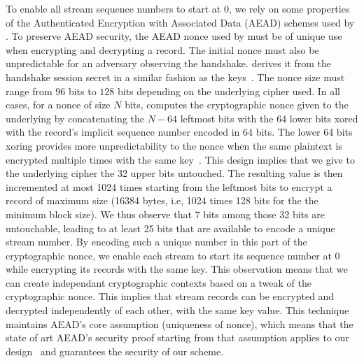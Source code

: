 To enable all stream sequence numbers to start at 0, we rely on some properties of the Authenticated Encryption with Associated Data (AEAD) schemes used
by . To preserve AEAD security, the AEAD nonce used by \tcpls
must be of unique use when encrypting and decrypting a record. The
initial nonce must also be unpredictable for an adversary observing the
handshake. \tcpls derives it from the \tls handshake session secret in
a similar fashion as the \tls keys~\cite{rfc8446}. The nonce size must range from $96$ bits to $128$ bits depending on the underlying cipher used. In all cases, for a nonce of size $N$ bits, \tls computes the cryptographic nonce given to the underlying by concatenating the $N-64$ leftmost bits with the 64 lower bits xored with the record's implicit sequence number encoded in 64 bits.
The lower 64 bits xoring provides more unpredictability to the nonce when
the same plaintext is encrypted multiple times with the same
key~\cite{bellare2016multi,hoang2018multi}. This design implies that we give to
the underlying cipher the 32 upper bits untouched. The resulting value is then
incremented at most 1024 times starting from the leftmost bits to encrypt a \tls
record of maximum size (16384 bytes, i.e, 1024 times 128 bits for the the
minimum block size). We thus observe that 7 bits among those 32 bits are
untouchable, leading to at least 25 bits that are available to encode a unique stream number. By encoding such a unique number in this part of the cryptographic nonce, we enable each stream to start its sequence number at 0 while encrypting its records with the same key. This observation means that we can create independant cryptographic contexts based on a tweak of the cryptographic nonce. This implies that stream records can be encrypted and decrypted independently of each other, with the same key value. This technique maintains AEAD's core assumption (uniqueness of nonce), which means that the state of art AEAD's security proof starting from that assumption applies to our design~\cite{chatterjee2011another} and guarantees the security of our scheme.

